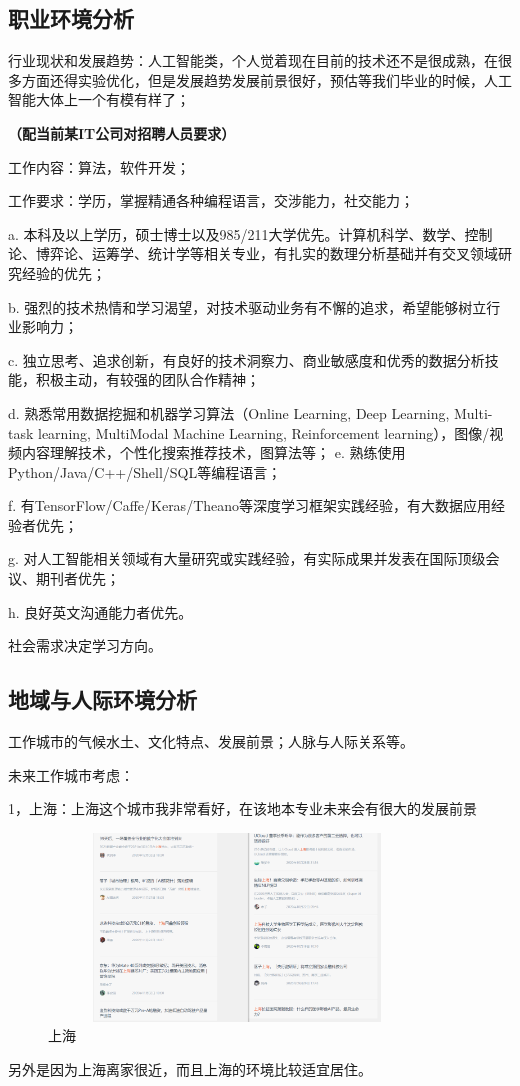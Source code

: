 \documentclass{article}
\begin{document}
\subsection{职业环境分析}
行业现状和发展趋势：人工智能类，个人觉着现在目前的技术还不是很成熟，在很多方面还得实验优化，但是发展趋势发展前景很好，预估等我们毕业的时候，人工智能大体上一个有模有样了；\par
\textbf{（配当前某IT公司对招聘人员要求）}\par
工作内容：算法，软件开发；\par
工作要求：学历，掌握精通各种编程语言，交涉能力，社交能力；\par 

a. 本科及以上学历，硕士博士以及985/211大学优先。计算机科学、数学、控制论、博弈论、运筹学、统计学等相关专业，有扎实的数理分析基础并有交叉领域研究经验的优先；\par
b. 强烈的技术热情和学习渴望，对技术驱动业务有不懈的追求，希望能够树立行业影响力；\par
c. 独立思考、追求创新，有良好的技术洞察力、商业敏感度和优秀的数据分析技能，积极主动，有较强的团队合作精神；\par
d. 熟悉常用数据挖掘和机器学习算法（Online Learning, Deep Learning, Multi-task learning, MultiModal Machine Learning, Reinforcement learning），图像/视频内容理解技术，个性化搜索推荐技术，图算法等；
e. 熟练使用Python/Java/C++/Shell/SQL等编程语言；\par
f. 有TensorFlow/Caffe/Keras/Theano等深度学习框架实践经验，有大数据应用经验者优先；\par
g. 对人工智能相关领域有大量研究或实践经验，有实际成果并发表在国际顶级会议、期刊者优先；\par
h. 良好英文沟通能力者优先。\par
社会需求决定学习方向。
\subsection{地域与人际环境分析}
工作城市的气候水土、文化特点、发展前景；人脉与人际关系等。\par

未来工作城市考虑：\par
1，上海：上海这个城市我非常看好，在该地本专业未来会有很大的发展前景\par 
\begin{figure}[h!]
\centering
\includegraphics[width=10cm, height=5cm]{1}
\caption{上海}
\label{fig:1}
\end{figure}
另外是因为上海离家很近，而且上海的环境比较适宜居住。
\end{document}
